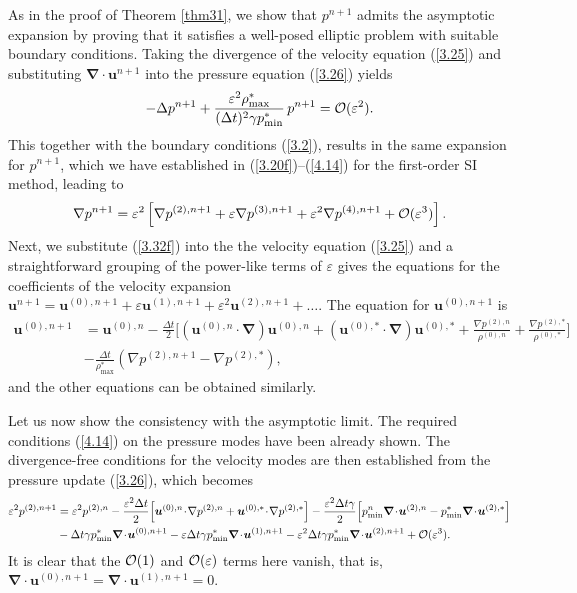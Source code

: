 \documentclass[A4paper,12pt,twoside]{article}
\newenvironment{proof}{{\flushleft \bf Proof:}}{}
\numberwithin{equation}{section}
\numberwithin{figure}{section}
\numberwithin{table}{section}
\def\muu {\bm{u}}
\def\bnabla{\bm{\nabla}}
\newcommand{\dt}{\Delta t}
\newcommand{\ve}{\varepsilon}
\newcommand\eref[1]{(\ref{#1})}
\begin{document}
\begin{proof}
As in the proof of Theorem \ref{thm31}, we show that $p^{n+1}$ admits the asymptotic expansion by proving that it satisfies a well-posed
elliptic problem with suitable boundary conditions. Taking the divergence of the velocity equation \eref{3.25} and substituting
$\bnabla\!\cdot\!\muu^{n+1}$ into the pressure equation \eref{3.26} yields
$$
-\Delta p^{n+1}+\frac{\ve^2\rho_{\max}^*}{(\dt)^2\gamma p_{\min}^*}\,p^{n+1}={\cal O}(\ve^2).
$$
This together with the boundary conditions \eref{3.2}, results in the same expansion for $p^{n+1}$, which we have established in
\eref{3.20f}--\eref{4.14} for the first-order SI method, leading to
\begin{equation}
\nabla p^{n+1}=\ve^2\left[\nabla p^{(2),n+1}+\ve\nabla p^{(3),n+1}+\ve^2\nabla p^{(4),n+1}+{\cal O}(\ve^3)\right].
\label{3.32f}
\end{equation}
Next, we substitute \eref{3.32f} into the the velocity equation \eref{3.25} and a straightforward grouping of the power-like terms of $\ve$
gives the equations for the coefficients of the velocity expansion
$\bm u^{n+1}=\bm u^{(0),n+1}+\ve\bm u^{(1),n+1}+\ve^2\bm u^{(2),n+1}+\dots$. The equation for $\bm u^{(0),n+1}$ is
\begin{equation}
\begin{aligned}
\bm u^{(0),n+1}&=\bm u^{(0),n}-\frac{\dt}{2}\bigg[(\bm u^{(0),n}\!\cdot\!\bnabla)\bm u^{(0),n}+(\bm u^{(0),*}\!\cdot\!\bnabla)\bm u^{(0),*}+
\frac{\nabla p^{(2),n}}{\rho^{(0),n}}+\frac{\nabla p^{(2),*}}{\rho^{(0),*}}\bigg]\\
&-\frac{\dt}{\rho_{\max}^*}\left(\nabla p^{(2),n+1}-\nabla p^{(2),*}\right),
\end{aligned}
\label{3.34}
\end{equation}
and the other equations can be obtained similarly.

Let us now show the consistency with the asymptotic limit. The required conditions \eref{4.14} on the pressure modes have been already
shown. The divergence-free conditions for the velocity modes are then established from the pressure update \eref{3.26}, which becomes
$$
\begin{aligned}
\ve^2p^{(2),n+1}&=\ve^2 p^{(2),n}-\frac{\ve^2\dt}{2}\Big[\bm u^{(0),n}\!\cdot\!\nabla p^{(2),n}+
\bm u^{(0),*}\!\cdot\!\nabla p^{(2),*}\Big]-
\frac{\ve^2\dt\gamma}{2}\Big[p_{\min}^n\bnabla\!\cdot\!\bm u^{(2),n}-p_{\min}^*\bnabla\!\cdot\!\bm u^{(2),*}\Big]\\
&-\dt\gamma p_{\min}^*\bnabla\!\cdot\!\bm u^{(0),n+1}-\ve\dt\gamma p_{\min}^*\bnabla\!\cdot\!\bm u^{(1),n+1}-
\ve^2\dt\gamma p_{\min}^*\bnabla\!\cdot\!\bm u^{(2),n+1}+{\cal O}(\ve^3).
\end{aligned}
$$
It is clear that the ${\cal O}(1)$ and ${\cal O}(\ve)$ terms here vanish, that is,
$\bnabla\!\cdot\!\bm u^{(0),n+1}=\bnabla\!\cdot\!\bm u^{(1),n+1}=0$.


\end{proof}
\end{document}
